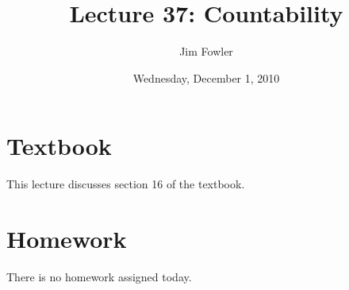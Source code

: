 \documentclass[12pt]{handout}
\title{Lecture 37: Countability}
\author{Jim Fowler}
\date{Wednesday, December  1, 2010}
\begin{document}
\maketitle

\section*{Textbook}

This lecture discusses section 16 of the textbook.

\section*{Homework} 

There is no homework assigned today.
\end{document}
